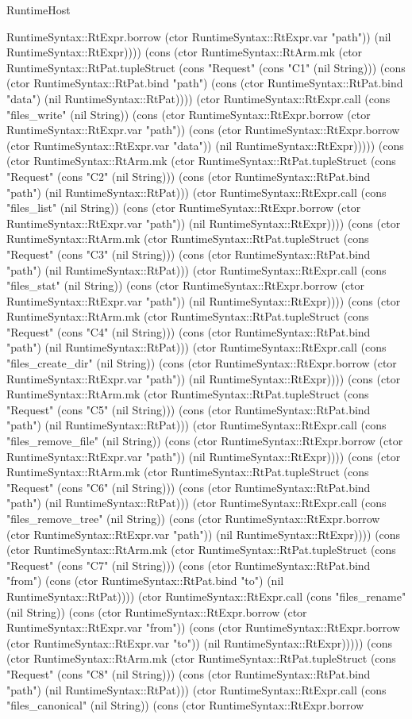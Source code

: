 \begin{lexlean}{RuntimeHost}
\begin{semanticmodule}
{RuntimeSyntax::RtExpr.borrow (ctor RuntimeSyntax::RtExpr.var "path")) (nil RuntimeSyntax::RtExpr)))) (cons (ctor RuntimeSyntax::RtArm.mk (ctor RuntimeSyntax::RtPat.tupleStruct (cons "Request" (cons "C1" (nil String))) (cons (ctor RuntimeSyntax::RtPat.bind "path") (cons (ctor RuntimeSyntax::RtPat.bind "data") (nil RuntimeSyntax::RtPat)))) (ctor RuntimeSyntax::RtExpr.call (cons "files_write" (nil String)) (cons (ctor RuntimeSyntax::RtExpr.borrow (ctor RuntimeSyntax::RtExpr.var "path")) (cons (ctor RuntimeSyntax::RtExpr.borrow (ctor RuntimeSyntax::RtExpr.var "data")) (nil RuntimeSyntax::RtExpr))))) (cons (ctor RuntimeSyntax::RtArm.mk (ctor RuntimeSyntax::RtPat.tupleStruct (cons "Request" (cons "C2" (nil String))) (cons (ctor RuntimeSyntax::RtPat.bind "path") (nil RuntimeSyntax::RtPat))) (ctor RuntimeSyntax::RtExpr.call (cons "files_list" (nil String)) (cons (ctor RuntimeSyntax::RtExpr.borrow (ctor RuntimeSyntax::RtExpr.var "path")) (nil RuntimeSyntax::RtExpr)))) (cons (ctor RuntimeSyntax::RtArm.mk (ctor RuntimeSyntax::RtPat.tupleStruct (cons "Request" (cons "C3" (nil String))) (cons (ctor RuntimeSyntax::RtPat.bind "path") (nil RuntimeSyntax::RtPat))) (ctor RuntimeSyntax::RtExpr.call (cons "files_stat" (nil String)) (cons (ctor RuntimeSyntax::RtExpr.borrow (ctor RuntimeSyntax::RtExpr.var "path")) (nil RuntimeSyntax::RtExpr)))) (cons (ctor RuntimeSyntax::RtArm.mk (ctor RuntimeSyntax::RtPat.tupleStruct (cons "Request" (cons "C4" (nil String))) (cons (ctor RuntimeSyntax::RtPat.bind "path") (nil RuntimeSyntax::RtPat))) (ctor RuntimeSyntax::RtExpr.call (cons "files_create_dir" (nil String)) (cons (ctor RuntimeSyntax::RtExpr.borrow (ctor RuntimeSyntax::RtExpr.var "path")) (nil RuntimeSyntax::RtExpr)))) (cons (ctor RuntimeSyntax::RtArm.mk (ctor RuntimeSyntax::RtPat.tupleStruct (cons "Request" (cons "C5" (nil String))) (cons (ctor RuntimeSyntax::RtPat.bind "path") (nil RuntimeSyntax::RtPat))) (ctor RuntimeSyntax::RtExpr.call (cons "files_remove_file" (nil String)) (cons (ctor RuntimeSyntax::RtExpr.borrow (ctor RuntimeSyntax::RtExpr.var "path")) (nil RuntimeSyntax::RtExpr)))) (cons (ctor RuntimeSyntax::RtArm.mk (ctor RuntimeSyntax::RtPat.tupleStruct (cons "Request" (cons "C6" (nil String))) (cons (ctor RuntimeSyntax::RtPat.bind "path") (nil RuntimeSyntax::RtPat))) (ctor RuntimeSyntax::RtExpr.call (cons "files_remove_tree" (nil String)) (cons (ctor RuntimeSyntax::RtExpr.borrow (ctor RuntimeSyntax::RtExpr.var "path")) (nil RuntimeSyntax::RtExpr)))) (cons (ctor RuntimeSyntax::RtArm.mk (ctor RuntimeSyntax::RtPat.tupleStruct (cons "Request" (cons "C7" (nil String))) (cons (ctor RuntimeSyntax::RtPat.bind "from") (cons (ctor RuntimeSyntax::RtPat.bind "to") (nil RuntimeSyntax::RtPat)))) (ctor RuntimeSyntax::RtExpr.call (cons "files_rename" (nil String)) (cons (ctor RuntimeSyntax::RtExpr.borrow (ctor RuntimeSyntax::RtExpr.var "from")) (cons (ctor RuntimeSyntax::RtExpr.borrow (ctor RuntimeSyntax::RtExpr.var "to")) (nil RuntimeSyntax::RtExpr))))) (cons (ctor RuntimeSyntax::RtArm.mk (ctor RuntimeSyntax::RtPat.tupleStruct (cons "Request" (cons "C8" (nil String))) (cons (ctor RuntimeSyntax::RtPat.bind "path") (nil RuntimeSyntax::RtPat))) (ctor RuntimeSyntax::RtExpr.call (cons "files_canonical" (nil String)) (cons (ctor RuntimeSyntax::RtExpr.borrow }
\end{semanticmodule}
\end{lexlean}
